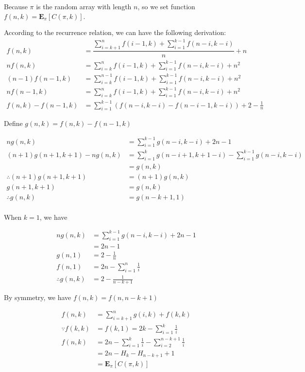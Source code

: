 \documentclass[
]{article}
\begin{document}
Because \(\pi\) is the random array with length \(n\), so we set
function \(f(n,k)=\mathbf{E}_{\pi}[C(\pi,k)]\).

According to the recurrence relation, we can have the following
derivation: \[\begin{aligned}
f(n,k)&=\dfrac{\sum_{i=k+1}^{n}f(i-1,k)+\sum_{i=1}^{k-1}f(n-i,k-i)}{n}+n\\
nf(n,k)&=\sum_{i=k}^{n}f(i-1,k)+\sum_{i=1}^{k-1}f(n-i,k-i)+n^2\\
(n-1)f(n-1,k)&=\sum_{i=k}^{n-1}f(i-1,k)+\sum_{i=1}^{k-1}f(n-i,k-i)+n^2\\
nf(n-1,k)&=\sum_{i=k}^{n}f(i-1,k)+\sum_{i=1}^{k-1}f(n-i,k-i)+n^2\\
f(n,k)-f(n-1,k)&=\sum_{i=1}^{k-1}\left(f(n-i,k-i)-f(n-i-1,k-i)\right)+2-\frac{1}{n}
\end{aligned}\]

Define \(g(n,k)=f(n,k)-f(n-1,k)\)

\[\begin{aligned}
ng(n,k)&=\sum_{i=1}^{k-1}g(n-i,k-i)+2n-1\\
(n+1)g(n+1,k+1)-ng(n,k)&=\sum_{i=1}^{k}g(n-i+1,k+1-i)-\sum_{i=1}^{k-1}g(n-i,k-i)\\
&=g(n,k)\\
\therefore(n+1)g(n+1,k+1)&=(n+1)g(n,k)\\
g(n+1,k+1)&=g(n,k)\\
\therefore g(n,k)&=g(n-k+1,1)\\
\end{aligned}\]

When \(k=1\), we have

\[\begin{aligned}
ng(n,k)&=\sum_{i=1}^{k-1}g(n-i,k-i)+2n-1\\
&=2n-1\\
g(n,1)&=2-\frac{1}{n}\\
f(n,1)&=2n-\sum_{i=1}^{n}\frac{1}{i}\\
\therefore g(n,k)&=2-\frac{1}{n-k+1}
\end{aligned}\]

By symmetry, we have \(f(n,k)=f(n,n-k+1)\)

\[\begin{aligned}
f(n,k)&=\sum_{i=k+1}^{n}g(i,k)+f(k,k)\\
\because f(k,k)&=f(k,1)=2k-\sum_{i=1}^{k}\frac{1}{i}\\
f(n,k)&=2n-\sum_{i=1}^{k}\frac{1}{i}-\sum_{i=2}^{n-k+1}\frac{1}{i}\\
&=2n-H_{k}-H_{n-k+1}+1\\
&=\mathbf{E}_{\pi}[C(\pi,k)]
\end{aligned}\]
\end{document}
